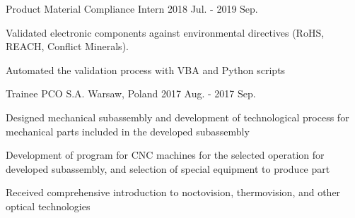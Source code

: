 \begin{cventries}
  \cventry
    {Product Material Compliance Intern} %
    {}
    {}
    {2018 Jul. - 2019 Sep.} %
    {
      \begin{cvitems} %
        \item {Validated electronic components against environmental directives (RoHS, REACH, Conflict Minerals).}
        \item {Automated the validation process with VBA and Python scripts}
      \end{cvitems}
    }

\cventry
{Trainee} %
{PCO S.A.}
{Warsaw, Poland}
{2017 Aug. - 2017 Sep.} %
{
  \begin{cvitems} %
    \item {Designed mechanical subassembly and development of technological process for mechanical parts included in the developed subassembly}
    \item {Development of program for CNC machines for the selected operation for developed subassembly, and selection of special equipment to produce part}
    \item {Received comprehensive introduction to noctovision, thermovision, and other optical technologies}
  \end{cvitems}
}

\end{cventries}
